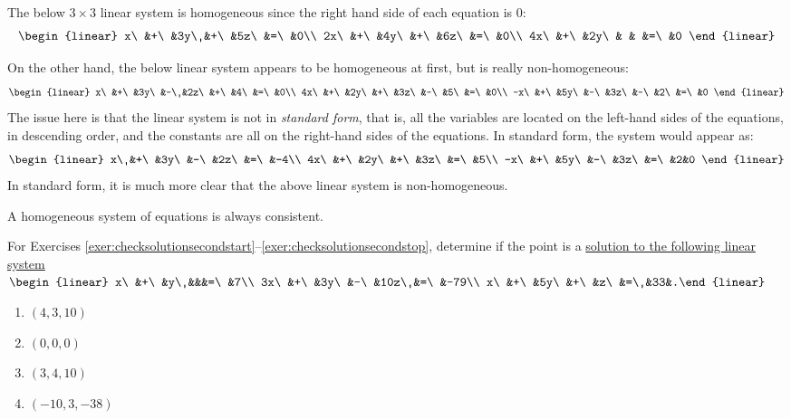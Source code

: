 \begin{Exam}  The below $3\times 3$ linear system is homogeneous since the right hand side of each equation is 0: %
\[\begin{linear} x\ &+\ &3y\ &+\ &5z\ &=\ &0\\
2x\ &+\ &4y\ &+\ &6z\ &=\ &0\\
4x\ &+\ &2y\ & & &=\ &0
\end{linear}\]

On the other hand, the below linear system appears to be homogeneous at first, but is really non-homogeneous: %
\[\begin{linear} x\ &+\ &3y\ &-\ &2z\ &+\ &4\ &=\ &0\\
4x\ &+\ &2y\ &+\ &3z\ &-\ &5\ &=\ &0\\
-x\ &+\ &5y\ &-\ &3z\ &-\ &2\ &=\ &0
\end{linear}\] The issue here is that the linear system is not in \emph{standard form}, that is, all the variables are located on the left-hand sides of the equations, in descending order, and the constants are all on the right-hand sides of the equations. In standard form, the system would appear as:
\[\begin{linear} x\ &+\ &3y\ &-\ &2z\ &=\ &-4\\
4x\ &+\ &2y\ &+\ &3z\ &=\ &5\\
-x\ &+\ &5y\ &-\ &3z\ &=\ &2&0
\end{linear}\] In standard form, it is much more clear that the above linear system is non-homogeneous.
\end{Exam}\vs

\begin{Prop}\label{prop:1.1homo} A homogeneous system of equations is always consistent. \end{Prop}


\noindent For Exercises \ref{exer:checksolutionsecondstart}--\ref{exer:checksolutionsecondstop}, determine if the point is a \hyperref[def:linearsystem]{solution to the following linear system}\\  $\begin{linear} x\ &+\ &y\ &&&=\ &7\\ 3x\ &+\ &3y\ &-\ &10z\ &=\ &-79\\ x\ &+\ &5y\ &+\ &z\ &=\ &33&.\end{linear}$  %
\begin{multicols}{4}
\begin{enumerate}[series=!HW!, label=\arabic*., ref=\arabic*]
\item \label{exer:checksolutionsecondstart} $(4,3,10)$ 
\item $(0,0,0)$
\item $(3,4,10)$
\item\label{exer:checksolutionsecondstop} $(-10,3,-38)$
\end{enumerate}
\end{multicols}\vs

